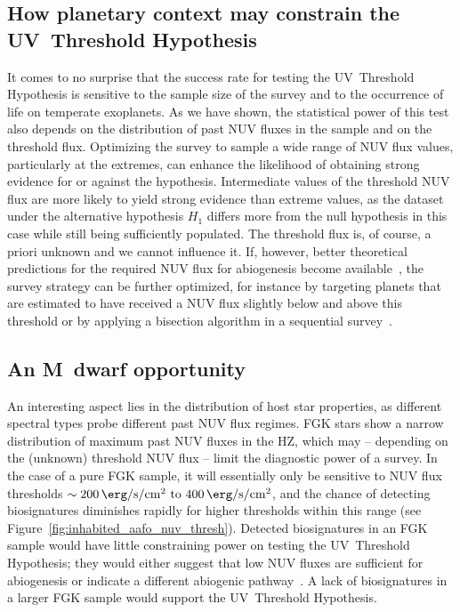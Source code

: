 \documentclass[twocolumn,twocolappendix,linenumbers]{aastex631}
\begin{document}
\subsection{How planetary context may constrain the UV~Threshold Hypothesis} %
It comes to no surprise that the success rate for testing the UV~Threshold Hypothesis is sensitive to the sample size of the survey and to the occurrence of life on temperate exoplanets.
As we have shown, the statistical power of this test also depends on the distribution of past \gls{NUV} fluxes in the sample and on the threshold flux.
Optimizing the survey to sample a wide range of \gls{NUV} flux values, particularly at the extremes, can enhance the likelihood of obtaining strong evidence for or against the hypothesis.
Intermediate values of the threshold \gls{NUV} flux are more likely to yield strong evidence than extreme values, as the dataset under the alternative hypothesis $H_1$ differs more from the null hypothesis in this case while still being sufficiently populated.
The threshold flux is, of course, a priori unknown and we cannot influence it.
If, however, better theoretical predictions for the required \gls{NUV} flux for abiogenesis become available~\citep{Rimmer2021}, the survey strategy can be further optimized, for instance by targeting planets that are estimated to have received a \gls{NUV} flux slightly below and above this threshold or by applying a bisection algorithm in a sequential survey~\citep{Fields2023}.

\subsection{An M~dwarf opportunity}
An interesting aspect lies in the distribution of host star properties, as different spectral types probe different past \gls{NUV} flux regimes.
FGK stars show a narrow distribution of maximum past \gls{NUV} fluxes in the \gls{HZ}, which may -- depending on the (unknown) threshold \gls{NUV} flux -- limit the diagnostic power of a survey.
In the case of a pure FGK sample, it will essentially only be sensitive to \gls{NUV} flux thresholds $\sim \SIrange{200}{400}{\erg\per\second\per\centi\meter\squared}$, and the chance of detecting biosignatures diminishes rapidly for higher thresholds within this range (see Figure~\ref{fig:inhabited_aafo_nuv_thresh}).
Detected biosignatures in an FGK sample would have little constraining power on testing the UV~Threshold Hypothesis; they would either suggest that low NUV fluxes are sufficient for abiogenesis or indicate a different abiogenic pathway~\citep[e.g.,][]{Westall2018}.
A lack of biosignatures in a larger FGK sample would support the UV~Threshold Hypothesis.
\end{document}

